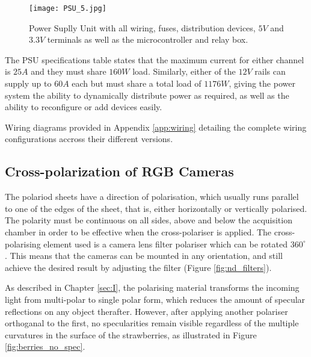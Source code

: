 \documentclass[fleqn,twoside,12pt]{report}
\begin{document}
\begin{figure}
	\begin{center}
		\texttt{[image: PSU\_5.jpg]}
	\end{center}
	\caption{Power Suplly Unit with all wiring, fuses, distribution devices, $5V$ and $3.3V$ terminals as well as the microcontroller and relay box.}
	\label{fig:PSU_5}
\end{figure}

The PSU specifications table states that the maximum current for either channel is $25A$ and they must share $160W$ load. Similarly, either of the $12V$ rails can supply up to $60A$ each but must share a total load of $1176W$, giving the power system the ability to dynamically distribute power as required, as well as the ability to reconfigure or add devices easily.


Wiring diagrams provided in Appendix \ref{app:wiring} detailing the complete wiring configurations accross their different versions.



\subsection{Cross-polarization of RGB Cameras}


The polariod sheets have a direction of polarisation, which usually runs parallel to one of the edges of the sheet, that is, either horizontally or vertically polarised. The polarity must be continuous on all sides, above and below the acquisition chamber in order to be effective when the cross-polariser is applied. The cross-polarising element used is a camera lens filter polariser which can be rotated $360^{\circ}$. This means that the cameras can be mounted in any orientation, and still achieve the desired result by adjusting the filter (Figure \ref{fig:nd_filters}).


As described in Chapter \ref{sec:I}, the polarising material transforms the incoming light from multi-polar to single polar form, which reduces the amount of specular reflections on any object therafter. However, after applying another polariser orthoganal to the first, no specularities remain visible regardless of the multiple curvatures in the surface of the strawberries, as illustrated in Figure \ref{fig:berries_no_spec}. 
\end{document}
